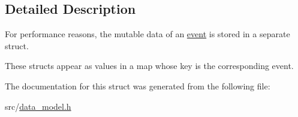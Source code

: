 \subsection{Detailed Description}
For performance reasons, the mutable data of an \hyperlink{structtricl_1_1event}{event} is stored in a separate struct. 

These structs appear as values in a map whose key is the corresponding event. 

The documentation for this struct was generated from the following file\+:\begin{DoxyCompactItemize}
\item 
src/\hyperlink{data__model_8h}{data\+\_\+model.\+h}\end{DoxyCompactItemize}
